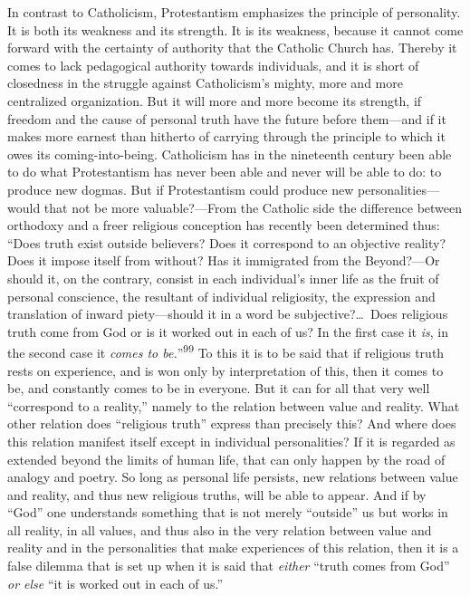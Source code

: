 \documentclass[12pt,a4paper]{book}
\newcommand{\opage}[1]{\marginnote{\footnotesize\textit{[#1]}}}
\begin{document}
In contrast to Catholicism, Protestantism emphasizes the principle of personality. It is both its
weakness and its strength. It is its weakness, because it cannot come forward with the certainty of
authority that the Catholic Church has. Thereby it comes to lack pedagogical authority towards
individuals, and it is short of closedness in the struggle against Catholicism's mighty, more and
more centralized organization. But it will more and more become its strength, if freedom and the
cause of personal 
\opage{202}truth have the future before them---and if it makes more earnest than hitherto of
carrying through the principle to which it owes its coming-into-being. Catholicism has in the
nineteenth century been able to do what Protestantism has never been able and never will be able to
do: to produce new dogmas. But if Protestantism could produce new personalities---would that not be
more valuable?---From the Catholic side the difference between orthodoxy and a freer religious
conception has recently been determined thus: ``Does truth exist outside believers? Does it
correspond to an objective reality? Does it impose itself from without? Has it immigrated from the
Beyond?---Or should it, on the contrary, consist in each individual's inner life as the fruit of
personal conscience, the resultant of individual religiosity, the expression and translation of
inward piety---should it in a word be subjective?\ldots\ Does religious truth come from God or is it
worked out in each of us? In the first case it \emph{is}, in the second case it \emph{comes to
be.}''\textsuperscript{99} To this it is to be said that if religious truth rests on experience, and
is won only by interpretation of this, then it comes to be, and constantly comes to be in everyone.
But it can for all that very well ``correspond to a reality,'' namely to the relation between value
and reality. What other relation does ``religious truth'' express than precisely this? And where does
this relation manifest itself except in individual personalities? If it is regarded as extended
beyond the limits of human life, that can only happen by the road of analogy and poetry. So long as
personal life persists, new relations between value and reality, and thus new religious truths, will
be able to appear. And if by ``God'' one understands something that is not merely ``outside'' us but
works in all reality, in all values, and thus also in the very relation between value and reality and
in the personalities that make experiences of this relation, then it is a false dilemma that is set
up when it is said that \emph{either} ``truth comes from God'' \emph{or else} ``it is worked out in
each of us.''
\end{document}
